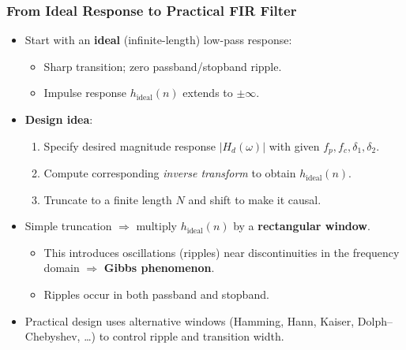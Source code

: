 \begin{frame}
	\frametitle{From Ideal Response to Practical FIR Filter}
	\small
		\begin{itemize}
		\item Start with an \textbf{ideal} (infinite-length) low-pass response:
		\begin{itemize}
			\item Sharp transition; zero passband/stopband ripple.
			\item Impulse response $h_\text{ideal}(n)$ extends to $\pm\infty$.
		\end{itemize}
		\item \textbf{Design idea}:
		\begin{enumerate}
			\item Specify desired magnitude response $|H_d(\omega)|$ with given $f_p,f_c,\delta_1,\delta_2$.
			\item Compute corresponding \emph{inverse transform} to obtain $h_\text{ideal}(n)$.
			\item Truncate to a finite length $N$ and shift to make it causal.
		\end{enumerate}
		\item Simple truncation $\Rightarrow$ multiply $h_\text{ideal}(n)$ by a \textbf{rectangular window}.
		\begin{itemize}
			\item This introduces oscillations (ripples) near discontinuities in the frequency domain
				$\Rightarrow$ \textbf{Gibbs phenomenon}.
			\item Ripples occur in both passband and stopband.
		\end{itemize}
		\item Practical design uses alternative windows (Hamming, Hann, Kaiser, Dolph–Chebyshev, …) to control ripple and transition width.
	\end{itemize}
\end{frame}


